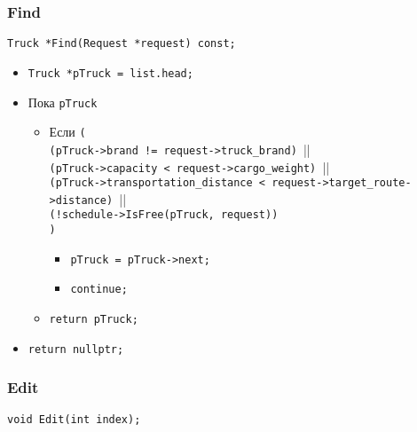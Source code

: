 \subsubsection*{Find}

\begin{lstlisting}
Truck *Find(Request *request) const;
\end{lstlisting}

\begin{itemize}
	\item \verb|Truck *pTruck = list.head;|
	\item Пока \verb|pTruck|
	\begin{itemize}
		\item Если \verb|(|\\
		\verb|(pTruck->brand != request->truck_brand) |||\\
		\verb|(pTruck->capacity < request->cargo_weight) |||\\ 
		\verb|(pTruck->transportation_distance < request->target_route->distance) |||\\
		\verb|(!schedule->IsFree(pTruck, request))|\\
		\verb|)|
		\begin{itemize}
			\item \verb|pTruck = pTruck->next;|
			\item \verb|continue;|
		\end{itemize}
		\item \verb|return pTruck;|
	\end{itemize}
	\item \verb|return nullptr;|
\end{itemize}

\subsubsection*{Edit}

\begin{lstlisting}
void Edit(int index);
\end{lstlisting}

